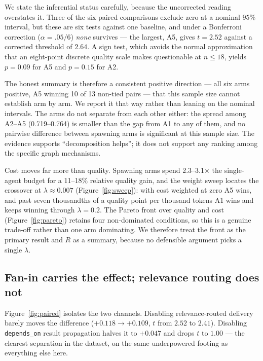\documentclass[10pt]{article}
\begin{document}
We state the inferential status carefully, because the uncorrected reading
overstates it. Three of the six paired comparisons exclude zero at a nominal
$95\%$ interval, but these are six tests against one baseline, and under a
Bonferroni correction ($\alpha = .05/6$) \emph{none} survives --- the largest,
A5, gives $t = 2.52$ against a corrected threshold of $2.64$. A sign test,
which avoids the normal approximation that an eight-point discrete quality
scale makes questionable at $n \leq 18$, yields $p = 0.09$ for A5 and
$p = 0.15$ for A2.

The honest summary is therefore a consistent positive direction --- all six
arms positive, A5 winning 10 of 13 non-tied pairs --- that this sample size
cannot establish arm by arm. We report it that way rather than leaning on the
nominal intervals. The arms do not separate from each other either: the spread
among A2--A5
(0.719--0.764) is smaller than the gap from A1 to any of them, and no pairwise
difference between spawning arms is significant at this sample size. The
evidence supports ``decomposition helps''; it does not support any ranking among
the specific graph mechanisms.

Cost moves far more than quality. Spawning arms spend 2.3--3.1$\times$ the
single-agent budget for a 11--18\% relative quality gain, and the weight
sweep locates the crossover at $\lambda \approx 0.007$ (Figure~\ref{fig:sweep}):
with cost weighted at zero A5 wins, and past seven thousandths of a quality
point per thousand tokens A1 wins and keeps winning through $\lambda = 0.2$. The
Pareto front over quality and cost (Figure~\ref{fig:pareto}) retains four
non-dominated conditions, so this is a genuine trade-off rather than one arm
dominating. We therefore treat the front as the primary result and $R$ as a
summary, because no defensible argument picks a single $\lambda$.

\subsection{Fan-in carries the effect; relevance routing does not}


Figure~\ref{fig:paired} isolates the two channels. Disabling
relevance-routed delivery barely moves the difference ($+0.118 \to +0.109$,
$t$ from $2.52$ to $2.41$). Disabling \texttt{depends\_on} result propagation
halves it to $+0.047$ and drops $t$ to $1.00$ --- the clearest separation in the
dataset, on the same underpowered footing as everything else here.
\end{document}
